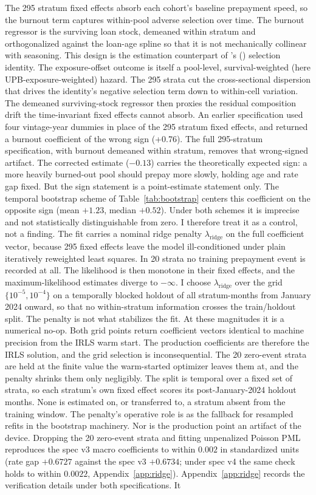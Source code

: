 \documentclass[12pt]{article}
\newcommand{\citepos}[1]{\citeauthor{#1}'s (\citeyear{#1})}
\begin{document}
The 295 stratum fixed effects absorb each cohort's baseline prepayment speed, so the burnout term captures within-pool adverse selection over time. The burnout regressor is the surviving loan stock, demeaned within stratum and orthogonalized against the loan-age spline so that it is not mechanically collinear with seasoning. This design is the estimation counterpart of \citepos{lesniewski2026} selection identity. The exposure-offset outcome is itself a pool-level, survival-weighted (here UPB-exposure-weighted) hazard. The 295 strata cut the cross-sectional dispersion that drives the identity's negative selection term down to within-cell variation. The demeaned surviving-stock regressor then proxies the residual composition drift the time-invariant fixed effects cannot absorb. An earlier specification used four vintage-year dummies in place of the 295 stratum fixed effects, and returned a burnout coefficient of the wrong sign (+0.76). The full 295-stratum specification, with burnout demeaned within stratum, removes that wrong-signed artifact. The corrected estimate ($-0.13$) carries the theoretically expected sign: a more heavily burned-out pool should prepay more slowly, holding age and rate gap fixed. But the sign statement is a point-estimate statement only. The temporal bootstrap scheme of Table~\ref{tab:bootstrap} centers this coefficient on the opposite sign (mean $+1.23$, median $+0.52$). Under both schemes it is imprecise and not statistically distinguishable from zero. I therefore treat it as a control, not a finding. The fit carries a nominal ridge penalty $\lambda_{\mathrm{ridge}}$ on the full coefficient vector, because 295 fixed effects leave the model ill-conditioned under plain iteratively reweighted least squares. In 20 strata no training prepayment event is recorded at all. The likelihood is then monotone in their fixed effects, and the maximum-likelihood estimates diverge to $-\infty$. I choose $\lambda_{\mathrm{ridge}}$ over the grid $\{10^{-5}, 10^{-4}\}$ on a temporally blocked holdout of all stratum-months from January 2024 onward, so that no within-stratum information crosses the train/holdout split. The penalty is not what stabilizes the fit. At these magnitudes it is a numerical no-op. Both grid points return coefficient vectors identical to machine precision from the IRLS warm start. The production coefficients are therefore the IRLS solution, and the grid selection is inconsequential. The 20 zero-event strata are held at the finite value the warm-started optimizer leaves them at, and the penalty shrinks them only negligibly. The split is temporal over a fixed set of strata, so each stratum's own fixed effect scores its post-January-2024 holdout months. None is estimated on, or transferred to, a stratum absent from the training window. The penalty's operative role is as the fallback for resampled refits in the bootstrap machinery. Nor is the production point an artifact of the device. Dropping the 20 zero-event strata and fitting unpenalized Poisson PML reproduces the spec v3 macro coefficients to within $0.002$ in standardized units (rate gap $+0.6727$ against the spec v3 $+0.6734$; under spec v4 the same check holds to within $0.0022$, Appendix~\ref{app:ridge}). Appendix~\ref{app:ridge} records the verification details under both specifications. It 
\end{document}

